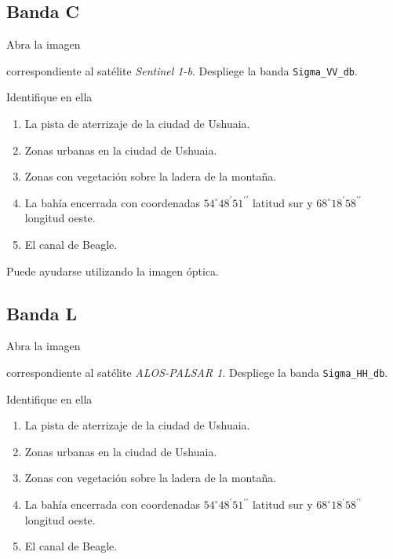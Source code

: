 \subsection{Banda C}

Abra la imagen
\begin{center}
  \end{center}

correspondiente al satélite \emph{Sentinel 1-b}. Despliege la banda \texttt{Sigma\_VV\_db}.

Identifique en ella

\begin{enumerate}
    \item La pista de aterrizaje de la ciudad de Ushuaia.
    \item Zonas urbanas en la ciudad de Ushuaia.
    \item Zonas con vegetación sobre la ladera de la montaña.
    \item La bahía encerrada con coordenadas $54^\circ 48^\prime 51^{\prime\prime}$ latitud sur y $68^\circ 18^\prime 58^{\prime\prime}$ longitud oeste.
    \item El canal de Beagle.
\end{enumerate}

Puede ayudarse utilizando la imagen óptica.

\subsection{Banda L}

Abra la imagen
\begin{center}
\end{center}
correspondiente al satélite \emph{ALOS-PALSAR 1}. Despliege la banda \texttt{Sigma\_HH\_db}.

Identifique en ella

\begin{enumerate}
    \item La pista de aterrizaje de la ciudad de Ushuaia.
    \item Zonas urbanas en la ciudad de Ushuaia.
    \item Zonas con vegetación sobre la ladera de la montaña.
    \item La bahía encerrada con coordenadas $54^\circ 48^\prime 51^{\prime\prime}$ latitud sur y $68^\circ 18^\prime 58^{\prime\prime}$ longitud oeste.
    \item El canal de Beagle.
\end{enumerate}

